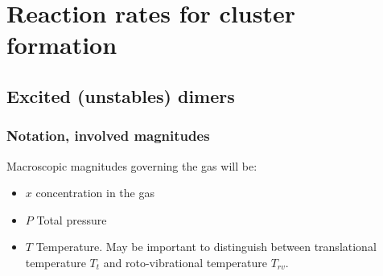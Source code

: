 \chapter{Reaction rates for cluster formation}
\label{C:react-rates-cluster}

\section{Excited (unstables) dimers}
\label{S:excit-unst-dimers}


\subsection{Notation, involved magnitudes}
\label{S:cant-de-inter}

Macroscopic magnitudes governing the gas will be:
\begin{itemize}
\item $x$  concentration in the gas
\item $P$ Total pressure
\item $T$ Temperature. May be important to distinguish between translational temperature $T_{t}$ and roto-vibrational temperature $T_{rv}$.
\end{itemize}



